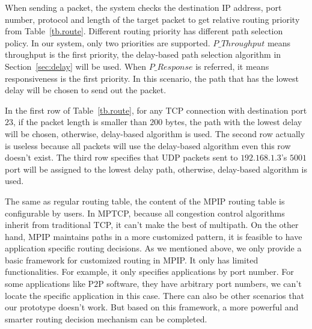 When sending a packet, the system checks the destination IP address, port number, protocol and length of the target packet to get relative routing priority from Table~\ref{tb.route}. Different routing priority has different path selection policy. In our system, only two priorities are supported. $P\_Throughput$ means throughput is the first priority, the delay-based path selection algorithm in Section~\ref{sec:delay} will be used. When $P\_Response$ is referred, it means responsiveness is the first priority. In this scenario, the path that has the lowest delay will be chosen to send out the packet.

In the first row of Table~\ref{tb.route}, for any TCP connection with destination port $23$, if the packet length is smaller than $200$ bytes, the path with the lowest delay will be chosen, otherwise, delay-based algorithm is used. The second row actually is useless because all packets will use the delay-based algorithm even this row doesn't exist. The third row specifies that UDP packets sent to $192.168.1.3$'s $5001$ port will be assigned to the lowest delay path, otherwise, delay-based algorithm is used.

The same as regular routing table, the content of the MPIP routing table is configurable by users. In MPTCP, because all congestion control algorithms inherit from traditional TCP, it can't make the best of multipath. On the other hand, MPIP maintains paths in a more customized pattern, it is feasible to have application specific routing decisions. As we mentioned above, we only provide a basic framework for customized routing in MPIP. It only has limited functionalities. For example, it only specifies applications by port number. For some applications like P$2$P software, they have arbitrary port numbers, we can't locate the specific application in this case. There can also be other scenarios that our prototype doesn't work. But based on this framework, a more powerful and smarter routing decision mechanism can be completed.

